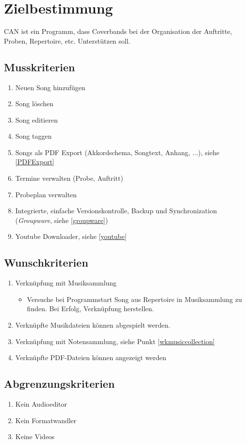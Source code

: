 \section{Zielbestimmung}

CAN ist ein Programm, dass Coverbands bei der Organisation der Auftritte, Proben, Repertoire, etc. Unterstützen soll.

\subsection{Musskriterien}

\begin{enumerate}[{/MK}1{/}]
\item Neuen Song hinzufügen
\item Song löschen
\item Song editieren
\item Song taggen
\item Songs als PDF Export (Akkordschema, Songtext, Anhang, $\dots$), siehe \ref{PDFExport}
\item Termine verwalten (Probe, Auftritt)
\item Probeplan verwalten
\item Integrierte, einfache Versionskontrolle, Backup und Synchronization (\emph{Groupware}, siehe \ref{groupware})
\item Youtube Downloader, siehe \ref{youtube}
\end{enumerate}

\subsection{Wunschkriterien}
\begin{enumerate}[{/WK}1{/}]
\item\label{wkmusiccollection} Verknüpfung mit Musiksammlung 
	\begin{itemize}
	\item Versuche bei Programmstart Song aus Repertoire in Musiksammlung zu finden. Bei Erfolg, Verknüpfung herstellen.
	\end{itemize}
\item Verknüpfte Musikdateien können abgespielt werden.
\item Verknüpfung mit Notensammlung, siehe Punkt \ref{wkmusiccollection}
\item Verknüpfte PDF-Dateien können angezeigt werden
\end{enumerate}

\subsection{Abgrenzungskriterien}
\begin{enumerate}[{/AK}1{/}]
\item Kein Audioeditor
\item Kein Formatwandler
\item Keine Videos
\end{enumerate}

